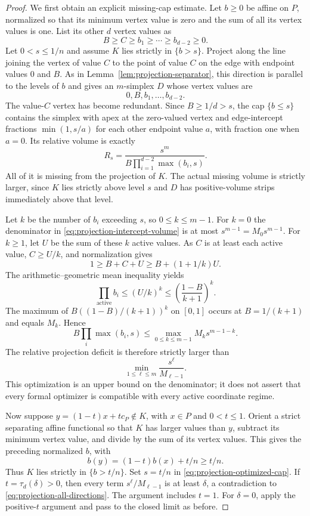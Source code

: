 \begin{proof}
We first obtain an explicit missing-cap estimate.  Let $b\geq0$ be
affine on $P$, normalized so that its minimum vertex value is zero
and the sum of all its vertex values is one.  List its other $d$
vertex values as
\[
 B\geq C\geq b_1\geq\cdots\geq b_{d-2}\geq0.
\]
Let $0<s\leq1/n$ and assume $K$ lies strictly in $\{b>s\}$.
Project along the line joining the vertex of value $C$ to the point
of value $C$ on the edge with endpoint values $0$ and $B$.
As in Lemma~\ref{lem:projection-separator}, this direction is
parallel to the levels of $b$ and gives an $m$-simplex $D$ whose
vertex values are
\[
 0,B,b_1,\ldots,b_{d-2}.
\]
The value-$C$ vertex has become redundant.  Since $B\geq1/d>s$,
the cap $\{b\leq s\}$ contains the simplex with apex at the
zero-valued vertex and edge-intercept fractions
$\min(1,s/a)$ for each other endpoint value $a$, with fraction one
when $a=0$.  Its relative volume is exactly
\begin{equation}
 R_s=\frac{s^m}{B\prod_{i=1}^{d-2}\max(b_i,s)}.
 \label{eq:projection-intercept-volume}
\end{equation}
All of it is missing from the projection of $K$.  The actual missing
volume is strictly larger, since $K$ lies strictly above level $s$
and $D$ has positive-volume strips immediately above that level.

Let $k$ be the number of $b_i$ exceeding $s$, so $0\leq k\leq m-1$.
For $k=0$ the denominator in \eqref{eq:projection-intercept-volume}
is at most $s^{m-1}=M_0s^{m-1}$.  For $k\geq1$, let $U$ be the sum
of these $k$ active values.  As $C$ is at least each active value,
$C\geq U/k$, and normalization gives
\[
 1\geq B+C+U\geq B+(1+1/k)U.
\]
The arithmetic--geometric mean inequality yields
\[
 \prod_{\mathrm{active}}b_i
 \leq(U/k)^k\leq\left(\frac{1-B}{k+1}\right)^k.
\]
The maximum of $B((1-B)/(k+1))^k$ on $[0,1]$ occurs at
$B=1/(k+1)$ and equals $M_k$.  Hence
\[
 B\prod_i\max(b_i,s)
 \leq\max_{0\leq k\leq m-1}M_k s^{m-1-k}.
\]
The relative projection deficit is therefore strictly larger than
\begin{equation}
 \min_{1\leq\ell\leq m}\frac{s^\ell}{M_{\ell-1}}.
 \label{eq:projection-optimized-cap}
\end{equation}
This optimization is an upper bound on the denominator; it does not
assert that every formal optimizer is compatible with every active
coordinate regime.

Now suppose $y=(1-t)x+t c_P\notin K$, with $x\in P$ and
$0<t\leq1$.  Orient a strict separating affine functional so that
$K$ has larger values than $y$, subtract its minimum vertex value,
and divide by the sum of its vertex values.  This gives the preceding
normalized $b$, with
\[
 b(y)=(1-t)b(x)+t/n\geq t/n.
\]
Thus $K$ lies strictly in $\{b>t/n\}$.  Set $s=t/n$ in
\eqref{eq:projection-optimized-cap}.  If $t=\tau_d(\delta)>0$,
then every term $s^\ell/M_{\ell-1}$ is at least $\delta$, a
contradiction to \eqref{eq:projection-all-directions}.  The argument
includes $t=1$.  For $\delta=0$, apply the positive-$t$ argument
and pass to the closed limit as before.
\end{proof}

